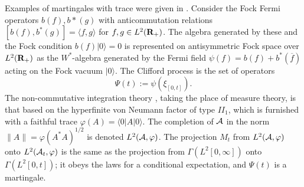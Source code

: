 Examples of martingales with trace were given in \cite{Barnett2}.
Consider the Fock Fermi operators $b(f),b*(g)$ with anticommutation relations
$[b(f),b^*(g)]=\langle f,g\rangle$ for $f,g\in L^2({\bf R}_+)$. The algebra
generated by these and the Fock condition $b(f)|0\rangle=0$ is represented on
antisymmetric Fock space over $L^2({\bf R}_+)$ as the $W^*$-algebra
generated by the Fermi field $\psi(f)=b(f)+b^*(\overline{f})$ acting on the
Fock vacuum $|0\rangle$. The Clifford process is the set of operators
\begin{equation}
\Psi(t):=\psi(\xi_{[0,t]}).
\end{equation}
The non-commutative integration theory \cite{Segal0,Segal2,Kunze},
taking the place of measure theory, is that based on the hyperfinite
von Neumann factor of type $II_1$, which is
furnished with a faithful trace $\varphi(A)=\langle 0|A|0\rangle$.
The completion of ${\cal A}$ in the norm $\|A\|=\varphi(A^*A)^{1/2}$
is denoted $L^2({\cal A},\varphi)$.
The projection $M_t$ from $L^2({\cal A},\varphi)$ onto $L^2({\cal A}_t,
\varphi)$
is the same as the projection from $\Gamma(L^2[0,\infty])$ onto $\Gamma
(L^2[0,t])$; it obeys the laws for a conditional expectation, and
$\Psi(t)$ is a martingale.

